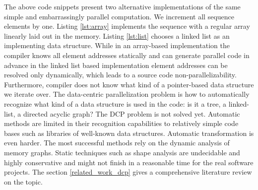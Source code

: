 \quad The above code snippets present two alternative implementations of the same simple and embarrassingly parallel computation. We increment all sequence elements by one. Listing \ref{lst:array} implements the sequence with a regular array linearly laid out in the memory. Listing \ref{lst:list} chooses a linked list as an implementing data structure. While in an array-based implementation the compiler knows all element addresses statically and can generate parallel code in advance in the linked list based implementation element addresses can be resolved only dynamically, which leads to a source code non-parallelizability. Furthermore, compiler does not know what kind of a pointer-based data structure we iterate over.\newline\null
\quad The data-centric parallelization problem is how to automatically recognize what kind of a data structure is used in the code: is it a tree, a linked-list, a directed acyclic graph? The DCP problem is not solved yet. Automatic methods are limited in their recognition capabilities to relatively simple code bases such as libraries of well-known data structures. Automatic transformation is even harder. The most successful methods rely on the dynamic analysis of memory graphs. Static techniques such as shape analysis are undecidable and highly conservative and might not finish in a reasonable time for the real software projects. The section \ref{related_work_dcp} gives a comprehensive literature review on the topic.
